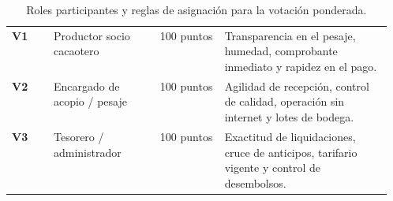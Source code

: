 \begin{table}[htbp]
\centering
\footnotesize
\caption{Roles participantes y reglas de asignaci\'on para la votaci\'on ponderada.}
\label{tab:votacion-diseno}
\begin{tabularx}{\linewidth}{|p{0.11\linewidth}|p{0.28\linewidth}|p{0.17\linewidth}|Y|}
\hline
{} &  &  & \\
\hline
\textbf{V1} & Productor socio cacaotero & 100 puntos & Transparencia en el pesaje, humedad, comprobante inmediato y rapidez en el pago.\\
\hline
{} \textbf{V2} & Encargado de acopio / pesaje & 100 puntos & Agilidad de recepci\'on, control de calidad, operaci\'on sin internet y lotes de bodega.\\
\hline
\textbf{V3} & Tesorero / administrador & 100 puntos & Exactitud de liquidaciones, cruce de anticipos, tarifario vigente y control de desembolsos.\\
\hline
\end{tabularx}
\end{table}
